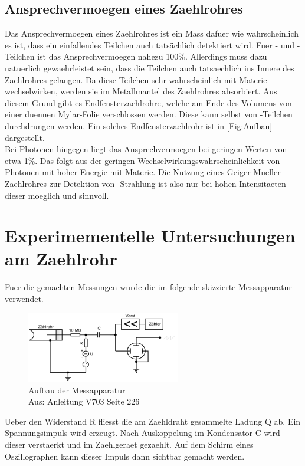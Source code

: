 \documentclass[titlepage=firstcover, captions=tableheading]{scrartcl}
\begin{document}
\subsection{Ansprechvermoegen eines Zaehlrohres}
Das Ansprechvermoegen eines Zaehlrohres ist ein Mass dafuer wie wahrscheinlich es ist, dass ein einfallendes Teilchen auch tatsächlich detektiert wird. Fuer \alpha- und \beta-Teilchen ist das Ansprechvermoegen nahezu 100\%. Allerdings muss dazu natuerlich gewaehrleistet sein, dass die Teilchen auch tatsaechlich ins Innere des Zaehlrohres gelangen. Da diese Teilchen sehr wahrscheinlich mit Materie wechselwirken, werden sie im Metallmantel des Zaehlrohres absorbiert. Aus diesem Grund gibt es Endfensterzaehlrohre, welche am Ende des Volumens von einer duennen Mylar-Folie verschlossen werden. Diese kann selbst von \alpha-Teilchen durchdrungen werden. Ein solches Endfensterzaehlrohr ist in \ref{Fig:Aufbau} dargestellt.\\
Bei Photonen hingegen liegt das Ansprechvermoegen bei geringen Werten von etwa 1\%. Das folgt aus der geringen Wechselwirkungswahrscheinlichkeit von Photonen mit hoher Energie mit Materie. Die Nutzung eines Geiger-Mueller-Zaehlrohres zur Detektion von \gamma-Strahlung ist also nur bei hohen Intensitaeten dieser moeglich und sinnvoll. 
\section{Experimementelle Untersuchungen am Zaehlrohr}
Fuer die gemachten Messungen wurde die im folgende skizzierte Messapparatur verwendet.
\begin{figure}[H]
    \centering
    \includegraphics[width=0.6\textwidth]{"Apparatur_Geiger.png"}
    \caption{Aufbau der Messapparatur \\ Aus: Anleitung V703 Seite 226}
    \label{Fig:Apparatur}
\end{figure}
\noindent Ueber den Widerstand R fliesst die am Zaehldraht gesammelte Ladung Q ab. Ein Spannungsimpuls wird erzeugt. Nach Auskoppelung im Kondensator C wird dieser verstaerkt und im Zaehlgeraet gezaehlt. Auf dem Schirm eines Oszillographen kann dieser Impuls dann sichtbar gemacht werden.
\end{document}
